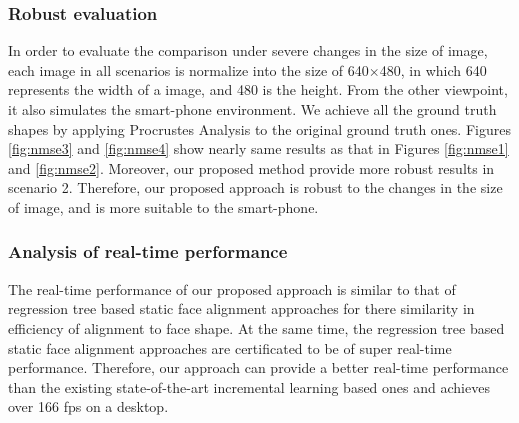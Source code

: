\documentclass[a4paper, 10pt, conference]{ieeeconf}      %
\begin{document}
\subsubsection{Robust evaluation}
In order to evaluate the comparison under severe changes in the size of image, each image in all scenarios is normalize into the size of 
640$\times$480, 
in which 640 represents the width of a image, and 480 is the height. From the other viewpoint, it also simulates the smart-phone environment. We 
achieve all the ground truth shapes by applying Procrustes Analysis to the original ground truth ones. Figures \ref{fig:nmse3} and \ref{fig:nmse4}
show nearly same results as that in Figures \ref{fig:nmse1} and \ref{fig:nmse2}. Moreover, our proposed method provide more robust results in scenario 2.
Therefore, our proposed approach is robust to the changes in the size of image, and is more suitable to the smart-phone.
\subsubsection{Analysis of real-time performance}
The real-time performance of our proposed approach is similar to that of regression tree based static face alignment approaches for there similarity
in efficiency of alignment to face shape. At the same time, the regression tree based static face alignment approaches are certificated to be of
super real-time performance. Therefore, our approach can provide a better real-time performance than the existing state-of-the-art incremental
learning based ones and achieves over 166 fps on a desktop.
\end{document}
